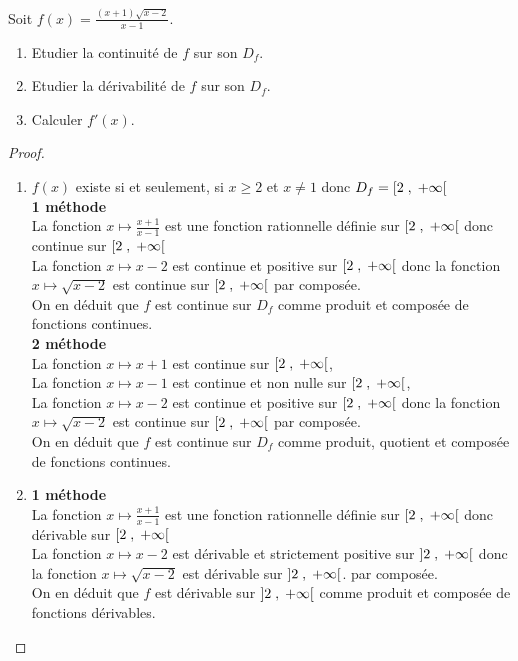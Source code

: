 \begin{example}
\begin{exercice}
Soit $ f (x)=\frac{(x+1)\sqrt{x-2}}{x-1}.$
 \begin{enumerate}
\item Etudier la continuité  de $ f $ sur son $D_{f}$.
\item Etudier  la dérivabilité de $ f $ sur son $D_{f}$.
\item Calculer $ f'(x). $
\end{enumerate}
\end{exercice}
\begin{proof}
\begin{enumerate}
\item $ f(x) $ existe si et seulement, si $ x \geq 2 $ et  $ x\neq 1 $ donc $ D_{f}=\left[2 \;,\; +\infty\right[ $ \\ \textbf{ 1\iere{} méthode } \\ La fonction $ x \mapsto \frac{x+1}{x-1} $ est une fonction rationnelle définie sur $\left[2 \;,\; +\infty\right[  $ donc continue  sur $\left[2 \;,\; +\infty\right[  $ \\ La fonction $ x \mapsto x-2$ est continue et positive sur $\left[2 \;,\; +\infty\right[  $  donc la fonction $ x \mapsto \sqrt{x-2} $ est continue sur $\left[2 \;,\; +\infty\right[  $  par composée.\\ On en déduit que $ f $ est continue sur $  D_{f}$ comme produit et composée de  fonctions continues. \\
\textbf{ 2\iere{} méthode } \\  La fonction $ x \mapsto x+1 $ est  continue  sur $\left[2 \;,\; +\infty\right[ $, \\ La fonction $ x \mapsto x-1 $ est  continue et non nulle  sur  $\left[2 \;,\; +\infty\right[ $,   \\ La fonction $ x \mapsto x-2$ est continue et positive sur $\left[2 \;,\; +\infty\right[$  donc la fonction $ x \mapsto \sqrt{x-2} $ est continue sur $\left[2 \;,\; +\infty\right[ $  par composée.\\ On en déduit que $ f $ est continue sur $  D_{f}$ comme produit, quotient et composée de  fonctions continues.\\

\item  \textbf{ 1\iere{} méthode } \\ La fonction $ x \mapsto \frac{x+1}{x-1} $ est une fonction rationnelle définie sur $\left[2 \;,\; +\infty\right[  $ donc  dérivable sur $\left[2 \;,\; +\infty\right[  $ \\ La fonction $ x \mapsto x-2$ est dérivable et strictement positive sur $\left]2 \;,\; +\infty\right[$ donc la fonction $ x \mapsto \sqrt{x-2} $ est  dérivable sur $\left]2 \;,\; +\infty\right[$. par composée.\\ On en déduit que $ f $ est dérivable  sur $\left]2 \;,\; +\infty\right[$ comme produit et composée de  fonctions dérivables. \\


\end{enumerate}
\end{proof}
\end{example}
